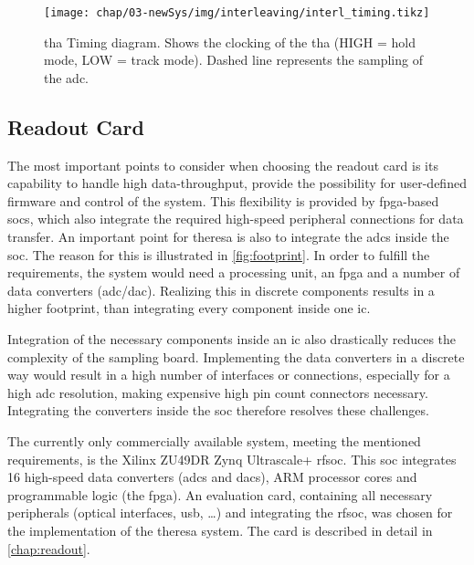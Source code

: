 \begin{sidewaysfigure}[tbh]
	\centering
	\tikzexternaldisable
	\texttt{[image: chap/03-newSys/img/interleaving/interl\_timing.tikz]}
	\tikzexternalenable
	\caption[Track-And-Hold Timing diagram]{\gls{tha} Timing diagram. Shows the clocking of the \gls{tha} (HIGH = hold mode, LOW = track mode). Dashed line represents the sampling of the \gls{adc}.}
	\label{fig:THA}
\end{sidewaysfigure}

 
\subsection{Readout Card}\label{sec:selection}
The most important points to consider when choosing the readout card is its capability to handle high data-throughput, provide the possibility for user-defined firmware and control of the system.
This flexibility is provided by \gls{fpga}-based \glspl{soc}, which also integrate the required high-speed peripheral connections for data transfer.
An important point for \gls{theresa} is also to integrate the \glspl{adc} inside the \gls{soc}. 
The reason for this is illustrated in \autoref{fig:footprint}. 
In order to fulfill the requirements, the system would need a processing unit, an \gls{fpga} and a number of data converters (\gls{adc}/\gls{dac}).
Realizing this in discrete components results in a higher footprint, than integrating every component inside one \gls{ic}.

Integration of the necessary components inside an \gls{ic} also drastically reduces the complexity of the sampling board.
Implementing the data converters in a discrete way would result in a high number of interfaces or connections, especially for a high \gls{adc} resolution,  making expensive high pin count connectors necessary.
Integrating the converters inside the \gls{soc} therefore resolves these challenges.

The currently only commercially available system, meeting the mentioned requirements, is the Xilinx ZU49DR Zynq Ultrascale+ \gls{rfsoc}.
This \gls{soc} integrates 16 high-speed data converters (\glspl{adc} and \glspl{dac}), ARM processor cores and programmable logic (the \gls{fpga}).
An evaluation card, containing all necessary peripherals (optical interfaces, \gls{usb}, \ldots) and integrating the \gls{rfsoc}, was chosen for the implementation of the \gls{theresa} system.
The card is described in detail in \autoref{chap:readout}.


